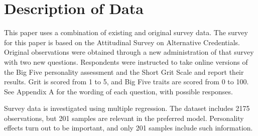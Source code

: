 \documentclass[review]{elsarticle}
\begin{document}

\section{Description of Data}

This paper uses a combination of existing and original survey data.
The survey for this paper is based on the Attitudinal Survey on Alternative Credentials\cite{dataset_vandivier}.
Original observations were obtained through a new administration of that survey with two new questions.
Respondents were instructed to take online versions of the Big Five personality assessment and the Short Grit Scale and report their results.
Grit is scored from 1 to 5, and Big Five traits are scored from 0 to 100.
See Appendix A for the wording of each question, with possible responses.

Survey data is investigated using multiple regression.
The dataset includes 2175 observations, but 201 samples are relevant in the preferred model.
Personality effects turn out to be important, and only 201 samples include such information.
\end{document}
